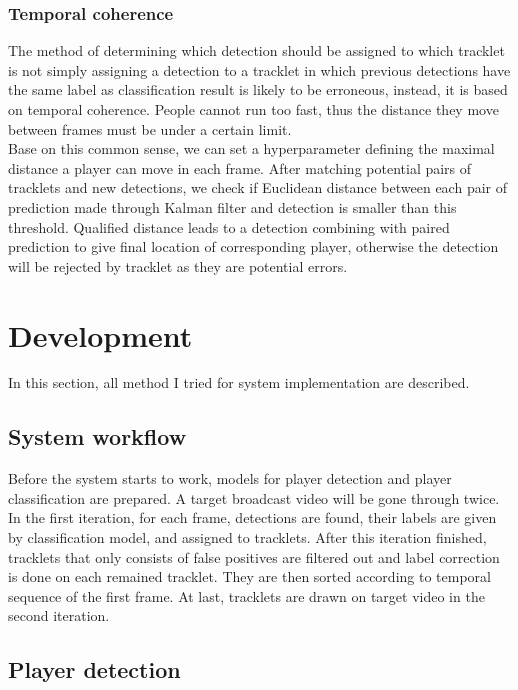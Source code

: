 \documentclass{article}
\begin{document}
\subsubsection{Temporal coherence}
The method of determining which detection should be assigned to which tracklet is not simply assigning a detection to a tracklet in which previous detections have the same label as classification result is likely to be erroneous, instead, it is based on temporal coherence. People cannot run too fast, thus the distance they move between frames must be under a certain limit.\\
Base on this common sense, we can set a hyperparameter defining the maximal distance a player can move in each frame. After matching potential pairs of tracklets and new detections, we check if Euclidean distance between each pair of prediction made through Kalman filter and detection is smaller than this threshold. Qualified distance leads to a detection combining with paired prediction to give final location of corresponding player, otherwise the detection will be rejected by tracklet as they are potential errors.
\newpage
\section{Development}
In this section, all method I tried for system implementation are described.
\subsection{System workflow}
Before the system starts to work, models for player detection and player classification are prepared. A target broadcast video will be gone through twice. In the first iteration, for each frame, detections are found, their labels are given by classification model, and assigned to tracklets. After this iteration finished, tracklets that only consists of false positives are filtered out and label correction is done on each remained tracklet. They are then sorted according to temporal sequence of the first frame. At last, tracklets are drawn on target video in the second iteration.\\
\subsection{Player detection}
\end{document}
